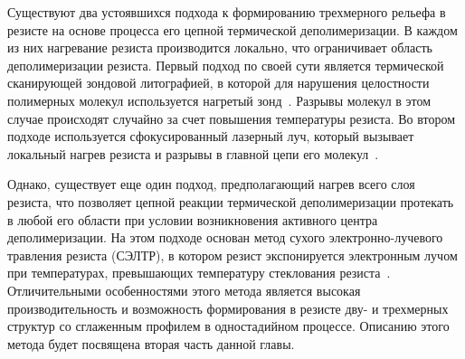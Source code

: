 Существуют два устоявшихся подхода к формированию трехмерного рельефа в резисте на основе процесса его цепной термической деполимеризации. В каждом из них нагревание резиста производится локально, что ограничивает область деполимеризации резиста. Первый подход по своей сути является термической сканирующей зондовой литографией, в которой для нарушения целостности полимерных молекул используется нагретый зонд~\cite{depol_fabrication_probe}. Разрывы молекул в этом случае происходят случайно за счет повышения температуры резиста. Во втором подходе используется сфокусированный лазерный луч, который вызывает локальный нагрев резиста и разрывы в главной цепи его молекул~\cite{depol_fabrication_laser}.

Однако, существует еще один подход, предполагающий нагрев всего слоя резиста, что позволяет цепной реакции термической деполимеризации протекать в любой его области при условии возникновения активного центра деполимеризации. На этом подходе основан метод сухого электронно-лучевого травления резиста (СЭЛТР), в котором резист экспонируется электронным лучом при температурах, превышающих температуру стеклования резиста~\cite{Bruk_2016_mee}. Отличительными особенностями этого метода является высокая производительность и возможность формирования в резисте дву- и трехмерных структур со сглаженным профилем в одностадийном процессе. Описанию этого метода будет посвящена вторая часть данной главы.
